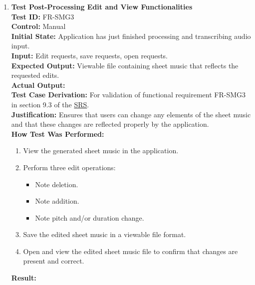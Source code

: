 \documentclass[12pt, titlepage]{article}
\begin{document}
\begin{enumerate}
  \item \textbf{Test Post-Processing Edit and View Functionalities} \\
    \newline
    \textbf{Test ID:} FR-SMG3 \\
    \textbf{Control:} Manual \\
    \textbf{Initial State:} Application has just finished processing and transcribing audio input. \\
    \textbf{Input:} Edit requests, save requests, open requests. \\
    \textbf{Expected Output:} Viewable file containing sheet music that reflects the requested edits. \\
    \textbf{Actual Output:} \\
    \textbf{Test Case Derivation:} For validation of functional requirement FR-SMG3 in section 9.3 of the 
    \href{https://github.com/emilyperica/ScoreGen/blob/main/docs/SRS-Volere/SRS.pdf}{SRS}. \\
    \textbf{Justification:} Ensures that users can change any elements of the sheet music and that these 
    changes are reflected properly by the application.\\ 
    \textbf{How Test Was Performed:}
    \begin{enumerate}
        \item View the generated sheet music in the application.
        \item Perform three edit operations:
        \begin{itemize}
            \item Note deletion.
            \item Note addition.
            \item Note pitch and/or duration change.
        \end{itemize}
        \item Save the edited sheet music in a viewable file format.
        \item Open and view the edited sheet music file to confirm that changes are present and correct.
    \end{enumerate}
    \textbf{Result:}
  \end{enumerate}
  
\end{document}
